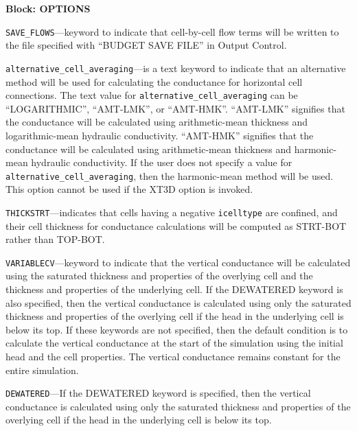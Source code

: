 
\item \textbf{Block: OPTIONS}

\begin{description}
\item \texttt{SAVE\_FLOWS}---keyword to indicate that cell-by-cell flow terms will be written to the file specified with ``BUDGET SAVE FILE'' in Output Control.

\item \texttt{alternative\_cell\_averaging}---is a text keyword to indicate that an alternative method will be used for calculating the conductance for horizontal cell connections.  The text value for \texttt{alternative\_cell\_averaging} can be ``LOGARITHMIC'', ``AMT-LMK'', or ``AMT-HMK''.  ``AMT-LMK'' signifies that the conductance will be calculated using arithmetic-mean thickness and logarithmic-mean hydraulic conductivity.  ``AMT-HMK'' signifies that the conductance will be calculated using arithmetic-mean thickness and harmonic-mean hydraulic conductivity. If the user does not specify a value for \texttt{alternative\_cell\_averaging}, then the harmonic-mean method will be used.  This option cannot be used if the XT3D option is invoked.

\item \texttt{THICKSTRT}---indicates that cells having a negative \texttt{icelltype} are confined, and their cell thickness for conductance calculations will be computed as STRT-BOT rather than TOP-BOT.

\item \texttt{VARIABLECV}---keyword to indicate that the vertical conductance will be calculated using the saturated thickness and properties of the overlying cell and the thickness and properties of the underlying cell.  If the DEWATERED keyword is also specified, then the vertical conductance is calculated using only the saturated thickness and properties of the overlying cell if the head in the underlying cell is below its top.  If these keywords are not specified, then the default condition is to calculate the vertical conductance at the start of the simulation using the initial head and the cell properties.  The vertical conductance remains constant for the entire simulation.

\item \texttt{DEWATERED}---If the DEWATERED keyword is specified, then the vertical conductance is calculated using only the saturated thickness and properties of the overlying cell if the head in the underlying cell is below its top.


\end{description}
